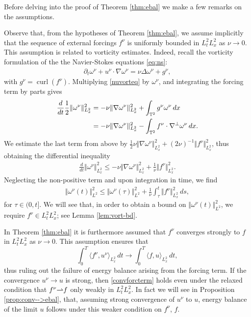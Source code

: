\documentclass[reqno,12pt]{amsart}
\DeclareMathOperator{\curl}{curl}
\begin{document}
Before delving into the proof of Theorem \ref{thm:ebal} we make a few remarks on the assumptions.

\begin{remark}
   Observe that, from the hypotheses of Theorem \ref{thm:ebal}, we assume implicitly that the sequence of external forcings $f^\nu$ is uniformly bounded in $L^2_tL^2_x$ as $\nu \to 0$. This assumption is related to vorticity estimates. Indeed, recall the vorticity formulation of the the Navier-Stokes equations \eqref{eq:ns}:
  \begin{align} \label{nuvorteq}
    \partial_t \omega^\nu + u^\nu \cdot \nabla \omega^\nu = \nu \Delta \omega^\nu + g^\nu,
  \end{align}
  with $g^\nu = \curl(f^\nu)$. Multiplying \eqref{nuvorteq} by $\omega^\nu$, and integrating the forcing term by parts gives
  \begin{align*}
  \frac{d}{dt} \frac12 \Vert \omega^\nu \Vert_{L^2_x}^2
  &=
  - \nu \Vert \nabla \omega^\nu \Vert_{L^2_x}^2 + \int_{\mathbb{T}^2} g^\nu \omega^\nu \, dx
  \\
  &=
  - \nu \Vert \nabla \omega^\nu \Vert_{L^2_x}^2 - \int_{\mathbb{T}^2}  f^\nu \cdot \nabla^\perp\omega^\nu \, dx.
  \end{align*}
  We estimate the last term from above by $ \frac12\nu \Vert \nabla \omega^\nu \Vert_{L^2_x}^2 + (2\nu)^{-1} \Vert f^\nu \Vert_{L^2_x}^2$, thus obtaining the differential inequality
  \begin{align}
    \frac{d}{dt} \Vert \omega^\nu \Vert_{L^2_x}^2 \le - \nu \Vert \nabla \omega^\nu \Vert^2_{L^2_x} +  \frac{1}{\nu} \Vert f^\nu \Vert_{L^2_x}^2.
    \end{align}
    Neglecting the non-positive term and upon integration in time, we find
    \begin{align}
      \label{eq:enst}
    \Vert \omega^\nu (t) \Vert^2_{L^2}
    \le
    \Vert \omega^\nu(\tau) \Vert^2_{L^2} + \frac1{\nu} \int_\tau^t \Vert f^\nu \Vert^2_{L^2_x} \, ds,
    \end{align}
    for $\tau\in (0,t]$. We will see that, in order to obtain a bound on $\Vert \omega^\nu(t) \Vert^2_{L^2}$, we require $f^\nu \in L^2_tL^2_x$; see Lemma \ref{lem:vort-bd}.
\end{remark}

\begin{remark}
  In Theorem \ref{thm:ebal} it is furthermore assumed that $f^\nu $ converges strongly to $f$ in $L^2_tL^2_x$ as $\nu \to 0$. This assumption ensures that
  \begin{equation} \label{convforcterm}
  \int_0^T \langle f^\nu, u^\nu \rangle_{L^2_x} \, dt \to \int_0^T \langle f, u \rangle_{L^2_x} \, dt,
   \end{equation}
   thus ruling out the failure of energy balance arising from the forcing term. If the convergence $u^\nu \to u$ is strong, then \eqref{convforcterm} holds even under the relaxed condition that $f^\nu {\rightharpoonup} f$ only weakly in $L^2_tL^2_x$. In fact we will see in Proposition \ref{prop:conv-->ebal}, that, assuming strong convergence of $u^\nu$ to $u$, energy balance of the limit $u$ follows under this weaker condition on $f^\nu$, $f$.
\end{remark}
\end{document}
